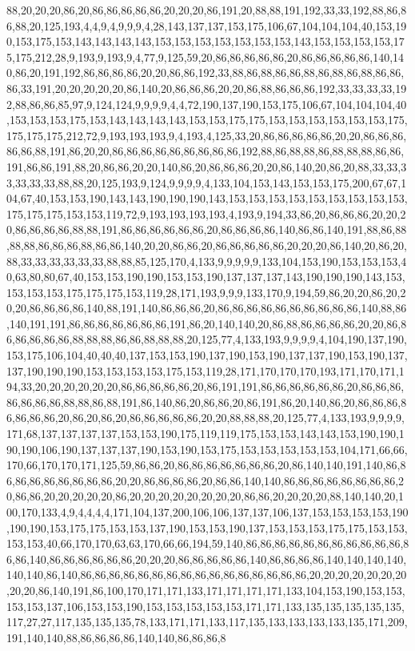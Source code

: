 88,20,20,20,86,20,86,86,86,86,86,20,20,20,86,191,20,88,88,191,192,33,33,192,88,86,86,88,20,125,193,4,4,9,4,9,9,9,4,28,143,137,137,153,175,106,67,104,104,104,40,153,190,153,175,153,143,143,143,143,153,153,153,153,153,153,153,143,153,153,153,153,175,175,212,28,9,193,9,193,9,4,77,9,125,59,20,86,86,86,86,86,20,86,86,86,86,86,140,140,86,20,191,192,86,86,86,86,20,20,86,86,192,33,88,86,88,86,86,88,86,88,86,88,86,86,86,33,191,20,20,20,20,20,86,140,20,86,86,86,20,20,86,88,86,86,86,192,33,33,33,33,192,88,86,86,85,97,9,124,124,9,9,9,9,4,4,72,190,137,190,153,175,106,67,104,104,104,40,153,153,153,175,153,143,143,143,143,153,153,175,175,153,153,153,153,153,153,175,175,175,175,212,72,9,193,193,193,9,4,193,4,125,33,20,86,86,86,86,86,20,20,86,86,86,86,86,88,191,86,20,20,86,86,86,86,86,86,86,86,86,192,88,86,88,88,86,88,88,88,86,86,191,86,86,191,88,20,86,86,20,20,140,86,20,86,86,86,20,20,86,140,20,86,20,88,33,33,33,33,33,33,88,88,20,125,193,9,124,9,9,9,9,4,133,104,153,143,153,153,175,200,67,67,104,67,40,153,153,190,143,143,190,190,190,143,153,153,153,153,153,153,153,153,153,175,175,175,153,153,119,72,9,193,193,193,193,4,193,9,194,33,86,20,86,86,86,20,20,20,86,86,86,86,88,88,191,86,86,86,86,86,86,20,86,86,86,86,140,86,86,140,191,88,86,88,88,88,86,86,86,88,86,86,140,20,20,86,86,20,86,86,86,86,86,20,20,20,86,140,20,86,20,88,33,33,33,33,33,33,88,88,85,125,170,4,133,9,9,9,9,9,133,104,153,190,153,153,153,40,63,80,80,67,40,153,153,190,190,153,153,190,137,137,137,143,190,190,190,143,153,153,153,153,175,175,175,153,119,28,171,193,9,9,9,133,170,9,194,59,86,20,20,86,20,20,20,86,86,86,86,140,88,191,140,86,86,86,20,86,86,86,86,86,86,86,86,86,86,140,88,86,140,191,191,86,86,86,86,86,86,86,191,86,20,140,140,20,86,88,86,86,86,86,20,20,86,86,86,86,86,86,88,88,88,86,86,88,88,88,20,125,77,4,133,193,9,9,9,9,4,104,190,137,190,153,175,106,104,40,40,40,137,153,153,190,137,190,153,190,137,137,190,153,190,137,137,190,190,190,153,153,153,153,175,153,119,28,171,170,170,170,193,171,170,171,194,33,20,20,20,20,20,20,86,86,86,86,86,20,86,191,191,86,86,86,86,86,86,20,86,86,86,86,86,86,86,88,88,86,88,191,86,140,86,20,86,86,20,86,191,86,20,140,86,20,86,86,86,86,86,86,86,20,86,20,86,20,86,86,86,86,86,20,20,88,88,88,20,125,77,4,133,193,9,9,9,9,171,68,137,137,137,137,153,153,190,175,119,119,175,153,153,143,143,153,190,190,190,190,106,190,137,137,137,190,153,190,153,175,153,153,153,153,153,104,171,66,66,170,66,170,170,171,125,59,86,86,20,86,86,86,86,86,86,86,20,86,140,140,191,140,86,86,86,86,86,86,86,86,86,20,20,86,86,86,86,20,86,86,140,140,86,86,86,86,86,86,86,86,20,86,86,20,20,20,20,20,86,20,20,20,20,20,20,20,20,86,86,20,20,20,20,88,140,140,20,100,170,133,4,9,4,4,4,4,171,104,137,200,106,106,137,137,106,137,153,153,153,153,190,190,190,153,175,175,153,153,137,190,153,153,190,137,153,153,153,175,175,153,153,153,153,40,66,170,170,63,63,170,66,66,194,59,140,86,86,86,86,86,86,86,86,86,86,86,86,86,140,86,86,86,86,86,86,20,20,20,86,86,86,86,86,140,86,86,86,86,140,140,140,140,140,140,86,140,86,86,86,86,86,86,86,86,86,86,86,86,86,86,86,86,20,20,20,20,20,20,20,20,20,86,140,191,86,100,170,171,171,133,171,171,171,171,133,104,153,190,153,153,153,153,137,106,153,153,190,153,153,153,153,153,171,171,133,135,135,135,135,135,117,27,27,117,135,135,135,78,133,171,171,133,117,135,133,133,133,133,135,171,209,191,140,140,88,86,86,86,86,140,140,86,86,86,8